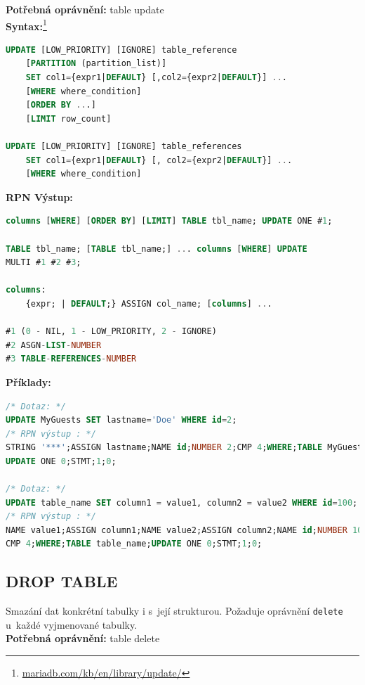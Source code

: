 \textbf{Potřebná oprávnění:} table update \\

\textbf{Syntax:}\footnote{\url{mariadb.com/kb/en/library/update/}}
\begin{lstlisting}[language=sql]
UPDATE [LOW_PRIORITY] [IGNORE] table_reference 
    [PARTITION (partition_list)]
    SET col1={expr1|DEFAULT} [,col2={expr2|DEFAULT}] ...
    [WHERE where_condition]
    [ORDER BY ...]
    [LIMIT row_count]

UPDATE [LOW_PRIORITY] [IGNORE] table_references
    SET col1={expr1|DEFAULT} [, col2={expr2|DEFAULT}] ...
    [WHERE where_condition]
\end{lstlisting}
\vspace*{\baselineskip}
\textbf{RPN Výstup:}
\begin{lstlisting}[language=sql]
columns [WHERE] [ORDER BY] [LIMIT] TABLE tbl_name; UPDATE ONE #1;

TABLE tbl_name; [TABLE tbl_name;] ... columns [WHERE] UPDATE 
MULTI #1 #2 #3;

columns:
    {expr; | DEFAULT;} ASSIGN col_name; [columns] ...

#1 (0 - NIL, 1 - LOW_PRIORITY, 2 - IGNORE)
#2 ASGN-LIST-NUMBER
#3 TABLE-REFERENCES-NUMBER
\end{lstlisting}
\newpage
\textbf{Příklady:}
\begin{lstlisting}[language=sql]
/* Dotaz: */
UPDATE MyGuests SET lastname='Doe' WHERE id=2;
/* RPN výstup : */
STRING '***';ASSIGN lastname;NAME id;NUMBER 2;CMP 4;WHERE;TABLE MyGuests;
UPDATE ONE 0;STMT;1;0;

/* Dotaz: */
UPDATE table_name SET column1 = value1, column2 = value2 WHERE id=100;
/* RPN výstup : */
NAME value1;ASSIGN column1;NAME value2;ASSIGN column2;NAME id;NUMBER 100;
CMP 4;WHERE;TABLE table_name;UPDATE ONE 0;STMT;1;0;
\end{lstlisting}

\subsection{DROP TABLE} \label{subsec:6:droptbl}
Smazání dat konkrétní tabulky i s~její strukturou. Požaduje oprávnění \texttt{delete} u~každé vyjmenované tabulky. \\

\textbf{Potřebná oprávnění:} table delete \\

